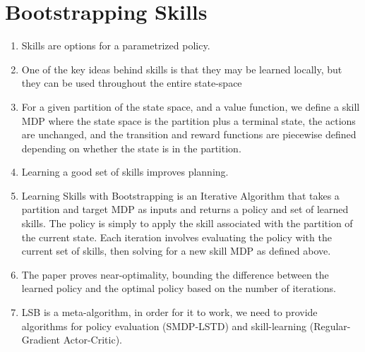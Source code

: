 \section{Bootstrapping Skills}
\begin{enumerate}
\item Skills are options for a parametrized policy.
\item One of the key ideas behind skills is that they may be learned locally, but they can be used throughout the entire state-space
\item For a given partition of the state space, and a value function, we define a skill MDP where the state space is the partition plus a terminal state, the actions are unchanged, and the transition and reward functions are piecewise defined depending on whether the state is in the partition.
\item Learning a good set of skills improves planning.
\item Learning Skills with Bootstrapping is an Iterative Algorithm that takes a partition and target MDP as inputs and returns a policy and set of learned skills. The policy is simply to apply the skill associated with the partition of the current state. Each iteration involves evaluating the policy with the current set of skills, then solving for a new skill MDP as defined above. 
\item The paper proves near-optimality, bounding the difference between the learned policy and the optimal policy based on the number of iterations.
\item LSB is a meta-algorithm, in order for it to work, we need to provide algorithms for policy evaluation (SMDP-LSTD) and skill-learning (Regular-Gradient Actor-Critic).
\end{enumerate}
